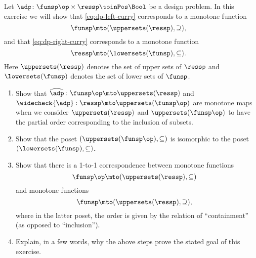 \begin{gradedexercise}\label{ex:CurryingDesignProblems}
Let $\adp\colon \funsp\op \times \ressp\toinPos \Bool$ be a design problem. In this exercise we will show that \cref{eq:dp-left-curry} corresponds to a monotone function
$$
\funsp \mto (\uppersets (\ressp), \supseteq),
$$
and that \cref{eq:dp-right-curry} corresponds to a monotone function
$$
\ressp \mto (\lowersets(\funsp), \subseteq).
$$
Here $\uppersets (\ressp)$ denotes the set of upper sets of $\ressp$ and $\lowersets(\funsp)$ denotes the set of lower sets of $\funsp$. 

\begin{enumerate}
\item Show that $\widehat{\adp} : \funsp\op \mto \uppersets (\ressp)$ and $\widecheck{\adp} : \ressp \mto \uppersets (\funsp\op)$ are monotone maps when we consider $\uppersets (\ressp)$ and $\uppersets (\funsp\op)$ to have the partial order corresponding to the inclusion of subsets. 
\item Show that the poset $(\uppersets (\funsp\op), \subseteq)$ is isomorphic to the poset $(\lowersets(\funsp), \subseteq)$. 
\item Show that there is a 1-to-1 correspondence between monotone functions 
$$
\funsp\op \mto (\uppersets (\ressp), \subseteq)
$$
and monotone functions
$$
\funsp \mto (\uppersets (\ressp), \supseteq),
$$
where in the latter poset, the order is given by the relation of ``containment'' (as opposed to ``inclusion''). 
\item Explain, in a few words, why the above steps prove the stated goal of this exercise. 
\end{enumerate}
\end{gradedexercise}



